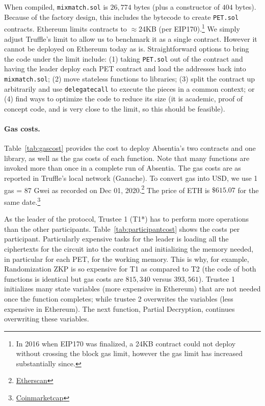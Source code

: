 When compiled, \texttt{mixmatch.sol} is $26,774$ bytes (plus a constructor of $404$ bytes). Because of the factory design, this includes the bytecode to create \texttt{PET.sol} contracts. Ethereum limits contracts to $\approx$24KB (per EIP170).\footnote{In 2016 when EIP170 was finalized, a 24KB contract could not deploy without crossing the block gas limit, however the gas limit has increased substantially since.} We simply adjust Truffle's limit to allow us to benchmark it as a single contract. However it cannot be deployed on Ethereum today as is. Straightforward options to bring the code under the limit include: (1) taking \texttt{PET.sol} out of the contract and having the leader deploy each PET contract and load the addresses back into \texttt{mixmatch.sol}; (2) move stateless functions to libraries; (3) split the contract up arbitrarily and use \texttt{delegatecall} to execute the pieces in a common context; or (4) find ways to optimize the code to reduce its size (it is academic, proof of concept code, and is very close to the limit, so this should be feasible). 


 





\paragraph{Gas costs.} 

Table~\ref{tab:gascost} provides the cost to deploy Absentia's two contracts and one library, as well as the gas costs of each function. Note that many functions are invoked more than once in a complete run of Absentia. The gas costs are as reported in Truffle's local network (Ganache). To convert gas into USD, we use 1 gas = 87 Gwei as recorded on Dec 01, 2020.\footnote{\href{https://etherscan.io/chart/gasprice}{Etherscan}} The price of ETH is $\$615.07$ for the same date.\footnote{\href{https://coinmarketcap.com/currencies/ethereum/historical-data/}{Coinmarketcap}}

As the leader of the protocol, Trustee 1 (T1*) has to perform more operations than the other participants. Table~\ref{tab:participantcost} shows the costs per participant. Particularly expensive tasks for the leader is loading all the ciphertexts for the circuit into the contract and initializing the memory needed, in particular for each PET, for the working memory. This is why, for example, Randomization ZKP is so expensive for T1 as compared to T2 (the code of both functions is identical but gas costs are $815,340$ versus $393,561$). Trustee 1 initializes many state variables (more expensive in Ethereum) that are not needed once the function completes; while trustee 2 overwrites the variables (less expensive in Ethereum). The next function, Partial Decryption, continues overwriting these variables. 

